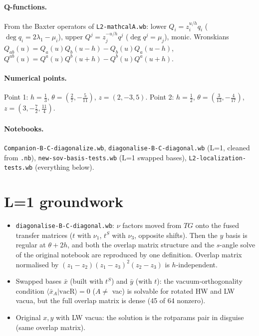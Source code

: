 \documentclass[11pt]{article}
\newcommand{\nb}[1]{\texttt{#1}}
\theoremstyle{definition}
\theoremstyle{remark}
\begin{document}
\paragraph{Q-functions.} From the Baxter operators of \nb{L2-mathcalA.wb}: lower $Q_i=z_i^{u/h}q_i$ ($\deg q_i=2\lambda_1-\mu_i$), upper $Q^j=z_j^{-u/h}q^j$ ($\deg q^j=\mu_j$), monic. Wronskians $Q_{ab}(u)=Q_a(u)Q_b(u-h)-Q_b(u)Q_a(u-h)$, $Q^{ab}(u)=Q^a(u)Q^b(u+h)-Q^b(u)Q^a(u+h)$.

\paragraph{Numerical points.} Point 1: $h=\tfrac13$, $\theta=(\tfrac27,-\tfrac5{11})$, $z=(2,-3,5)$. Point 2: $h=\tfrac12$, $\theta=(\tfrac3{13},-\tfrac4{17})$, $z=(3,-\tfrac72,\tfrac{11}4)$.

\paragraph{Notebooks.} \nb{Companion-B-C-diagonalize.wb}, \nb{diagonalise-B-C-diagonal.wb} (L=1, cleaned from \nb{.nb}), \nb{new-sov-basis-tests.wb} (L=1 swapped bases), \nb{L2-localization-tests.wb} (everything below).

\section{L=1 groundwork}

\begin{itemize}
\item \nb{diagonalise-B-C-diagonal.wb}: $\nu$ factors moved from $TG$ onto the fused transfer matrices ($t$ with $\nu_1$, $t^S$ with $\nu_3$, opposite shifts). Then the $y$ basis is regular at $\theta+2h$, and both the overlap matrix structure and the $s$-angle solve of the original notebook are reproduced by one definition. Overlap matrix normalised by $(z_1-z_2)(z_1-z_3)^2(z_2-z_3)$ is $h$-independent.
\item Swapped bases $\bar x$ (built with $t^S$) and $\bar y$ (with $t$): the vacuum-orthogonality condition $\langle\bar x_A|\mathrm{vacR}\rangle=0$ ($A\neq$ vac) is solvable for rotated HW and LW vacua, but the full overlap matrix is dense (45 of 64 nonzero).
\item Original $x,y$ with LW vacua: the solution is the rotparams pair in disguise (same overlap matrix).
\end{itemize}
\end{document}
